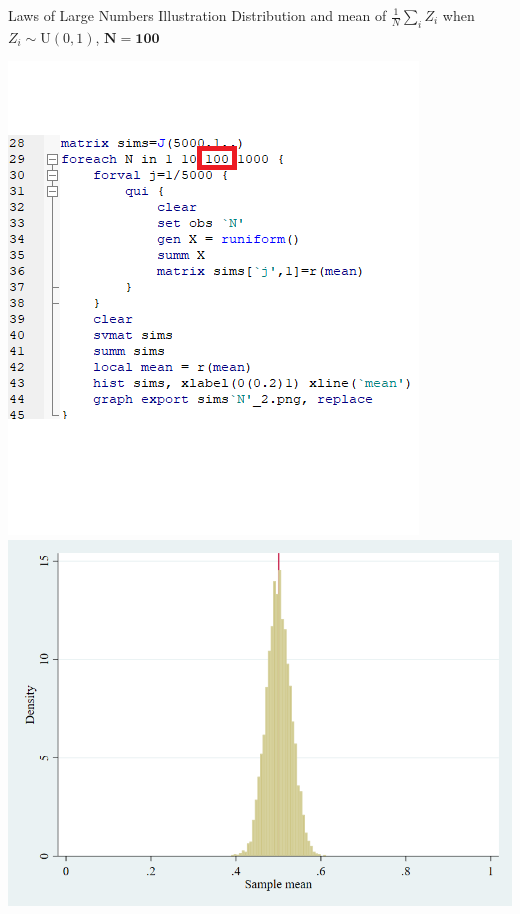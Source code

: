 \documentclass[11pt,english,handout]{beamer}
\begin{document}
\begin{frame}{Laws of Large Numbers Illustration}
	\vspace{0.2cm}
	Distribution and mean of $\frac{1}{N}\sum_i Z_i$ when $Z_i\sim \mathrm{U}(0,1)$, $\mathbf{N=100}$
	
	\begin{center}
		\includegraphics[scale=0.4]{Stata7.png} \includegraphics[scale=0.25]{sims100_2.png}
	\end{center}
	
\end{frame}
\end{document}
